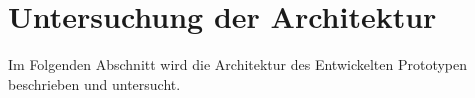\section{Untersuchung der Architektur}

Im Folgenden Abschnitt wird die Architektur des Entwickelten Prototypen beschrieben und untersucht.
\pagebreak